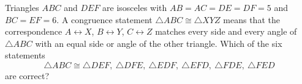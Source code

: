 Triangles $ABC$ and $DEF$ are isosceles with $AB=AC=DE=DF=5$ and $BC=EF=6$. A congruence statement $\triangle ABC\cong\triangle XYZ$ means that the correspondence $A\leftrightarrow X$, $B\leftrightarrow Y$, $C\leftrightarrow Z$ matches every side and every angle of $\triangle ABC$ with an equal side or angle of the other triangle. Which of the six statements
\[
\triangle ABC\cong\triangle DEF,\ \triangle DFE,\ \triangle EDF,\ \triangle EFD,\ \triangle FDE,\ \triangle FED
\]
are correct?
